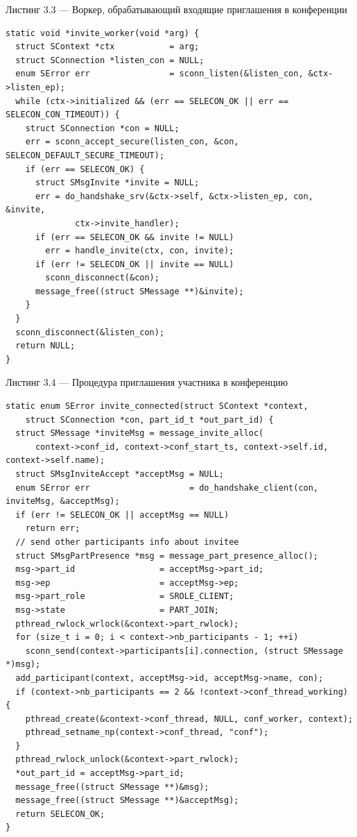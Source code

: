 \noindent
Листинг 3.3 --- Воркер, обрабатывающий входящие приглашения в конференции

{\fontsize{11pt}{9pt}\selectfont
\begin{verbatim}
static void *invite_worker(void *arg) {
  struct SContext *ctx           = arg;
  struct SConnection *listen_con = NULL;
  enum SError err                = sconn_listen(&listen_con, &ctx->listen_ep);
  while (ctx->initialized && (err == SELECON_OK || err == SELECON_CON_TIMEOUT)) {
    struct SConnection *con = NULL;
    err = sconn_accept_secure(listen_con, &con, SELECON_DEFAULT_SECURE_TIMEOUT);
    if (err == SELECON_OK) {
      struct SMsgInvite *invite = NULL;
      err = do_handshake_srv(&ctx->self, &ctx->listen_ep, con, &invite,
              ctx->invite_handler);
      if (err == SELECON_OK && invite != NULL)
        err = handle_invite(ctx, con, invite);
      if (err != SELECON_OK || invite == NULL)
        sconn_disconnect(&con);
      message_free((struct SMessage **)&invite);
    }
  }
  sconn_disconnect(&listen_con);
  return NULL;
}
\end{verbatim}}

Листинг 3.4 --- Процедура приглашения участника в конференцию

{\fontsize{11pt}{9pt}\selectfont
\begin{verbatim}
static enum SError invite_connected(struct SContext *context,
    struct SConnection *con, part_id_t *out_part_id) {
  struct SMessage *inviteMsg = message_invite_alloc(
      context->conf_id, context->conf_start_ts, context->self.id, context->self.name);
  struct SMsgInviteAccept *acceptMsg = NULL;
  enum SError err                    = do_handshake_client(con, inviteMsg, &acceptMsg);
  if (err != SELECON_OK || acceptMsg == NULL)
    return err;
  // send other participants info about invitee
  struct SMsgPartPresence *msg = message_part_presence_alloc();
  msg->part_id                 = acceptMsg->part_id;
  msg->ep                      = acceptMsg->ep;
  msg->part_role               = SROLE_CLIENT;
  msg->state                   = PART_JOIN;
  pthread_rwlock_wrlock(&context->part_rwlock);
  for (size_t i = 0; i < context->nb_participants - 1; ++i)
    sconn_send(context->participants[i].connection, (struct SMessage *)msg);
  add_participant(context, acceptMsg->id, acceptMsg->name, con);
  if (context->nb_participants == 2 && !context->conf_thread_working) {
    pthread_create(&context->conf_thread, NULL, conf_worker, context);
    pthread_setname_np(context->conf_thread, "conf");
  }
  pthread_rwlock_unlock(&context->part_rwlock);
  *out_part_id = acceptMsg->part_id;
  message_free((struct SMessage **)&msg);
  message_free((struct SMessage **)&acceptMsg);
  return SELECON_OK;
}
\end{verbatim}}

